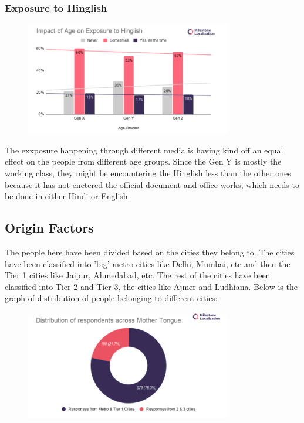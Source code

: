 \documentclass{article}
\begin{document}
\subsubsection{Exposure to Hinglish}

\begin{figure}[H]
    \centering
    \includegraphics[width=0.8\textwidth]{plots/age_exposure.png}
\end{figure}

The exxposure happening through different media is having kind off an equal effect on the people from different age groups. Since the Gen Y is mostly the working class, they might be encountering the Hinglish less than the other ones because it has not enetered the official document and office works, which needs to be done in either Hindi or English. 

\subsection{Origin Factors}

The people here have been divided based on the cities they belong to. The cities have been classified into 'big' metro cities like Delhi, Mumbai, etc and then the Tier 1 cities like Jaipur, Ahmedabad, etc. The rest of the cities have been classified into Tier 2 and Tier 3, the cities like Ajmer and Ludhiana. Below is the graph of distribution of people belonging to different cities:

\begin{figure}[H]
    \centering
    \includegraphics[width=0.8\textwidth]{plots/distribution_with_city.png}
\end{figure}
\end{document}
